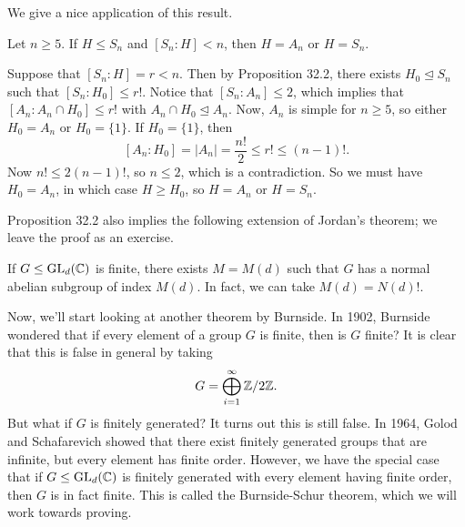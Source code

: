We give a nice application of this result. 

\begin{exmp}{}
    Let $n \geq 5$. If $H \leq S_n$ and $[S_n : H] < n$, then $H = A_n$ or 
    $H = S_n$. 
\end{exmp}
\begin{pf}
    Suppose that $[S_n : H] = r < n$. Then by Proposition 32.2, there exists 
    $H_0 \trianglelefteq S_n$ such that $[S_n : H_0] \leq r!$. Notice that 
    $[S_n : A_n] \leq 2$, which implies that $[A_n : A_n \cap H_0] \leq r!$ 
    with $A_n \cap H_0 \trianglelefteq A_n$. Now, $A_n$ is simple for 
    $n \geq 5$, so either $H_0 = A_n$ or $H_0 = \{1\}$. If $H_0 = \{1\}$, then 
    \[ [A_n : H_0] = |A_n| = \frac{n!}2 \leq r! \leq (n-1)!. \] 
    Now $n! \leq 2(n-1)!$, so $n \leq 2$, which is a contradiction. So we must 
    have $H_0 = A_n$, in which case $H \geq H_0$, so $H = A_n$ or $H = S_n$. 
\end{pf}

Proposition 32.2 also implies the following extension of Jordan's theorem; 
we leave the proof as an exercise. 

\begin{theo}{}
    If $G \leq \operatorname{GL}_d(\mathbb{C})$ is finite, there exists $M = M(d)$ such that 
    $G$ has a normal abelian subgroup of index $M(d)$. In fact, we can 
    take $M(d) = N(d)!$. 
\end{theo}

Now, we'll start looking at another theorem by Burnside. In 1902, Burnside 
wondered that if every element of a group $G$ is finite, then is $G$ finite? 
It is clear that this is false in general by taking 
\[ G = \bigoplus_{i=1}^\infty \mathbb{Z}/2\mathbb{Z}. \] 
But what if $G$ is finitely generated? It turns out this is still false. 
In 1964, Golod and Schafarevich showed that there exist finitely generated 
groups that are infinite, but every element has finite order. However, 
we have the special case that if $G \leq \operatorname{GL}_d(\mathbb{C})$ is finitely generated 
with every element having finite order, then $G$ is in fact finite. This is 
called the Burnside-Schur theorem, which we will work towards proving. 

